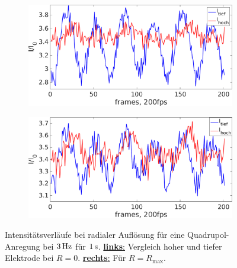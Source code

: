 \documentclass[numbers=noenddot,a4paper]{scrartcl}
\newcommand{\ix}[1]{_\text{#1}}
\newcommand{\fett}[1]{\textbf{#1}}
\begin{document}
						\begin{figure}[!t]
							\centering
							\begin{subfigure}{0.49\textwidth}
								\centering
								\includegraphics[width=\textwidth,height=0.6\textwidth]{figs/auswertung/intenshochutiefquadin3Hz1sek.png}
							\end{subfigure}
							\begin{subfigure}{0.49\textwidth}
								\centering
								\includegraphics[width=\textwidth,height=0.6\textwidth]{figs/auswertung/intenshochutiefquadout3Hz1sek.png}
							\end{subfigure}
							\caption{Intensitätsverläufe bei radialer Auflösung für eine Quadrupol-Anregung bei $\unit[3]{Hz}$ für $\unit[1]{s}$. \underline{\fett{links}:} Vergleich hoher und tiefer Elektrode bei $R=0$. \underline{\fett{rechts}:} Für $R=R\ix{max}$.}\label{img:intensquadhochutiefrad}
						\end{figure}
\end{document}
